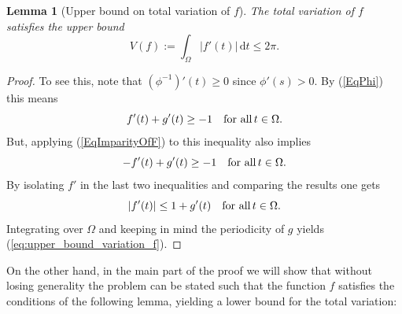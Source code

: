 \documentclass{article}
\newtheorem{lemma}[definition]{Lemma}
\newcommand{\dt}{\,\mathrm{d}t}
\begin{document}
\begin{lemma}[Upper bound on total variation of $f$] \label{lem:upper_bound_variation_f}
    The total variation of $f$ satisfies the upper bound
    \begin{equation}\label{eq:upper_bound_variation_f}
        V(f) := \int_\Omega |f'(t)| \dt \le 2\pi.
    \end{equation}
\end{lemma}
\begin{proof}
    To see this, note that $(\phi^{-1})'(t) \ge 0$ since $\phi'(s)>0$. By (\ref{EqPhi}) this means
    \begin{equation*}
        f'(t) + g'(t) \ge -1 \quad \textmd{for all} \, t\in \Omega.
    \end{equation*}
    But, applying (\ref{EqImparityOfF}) to this inequality also implies
    \begin{equation*}
        -f'(t) + g'(t) \ge -1 \quad \textmd{for all} \, t\in \Omega.
    \end{equation*}
    By isolating $f'$ in the last two inequalities and comparing the results one gets
    \begin{equation*}
        |f'(t)| \le 1 + g'(t) \quad \textmd{for all} \, t\in \Omega.
    \end{equation*}
    Integrating over $\Omega$ and keeping in mind the periodicity of $g$ yields (\ref{eq:upper_bound_variation_f}).
\end{proof}

On the other hand, in the main part of the proof we will show that without losing generality the problem can be stated such that the function $f$ satisfies the conditions of the following lemma, yielding a lower bound for the total variation:
\end{document}
